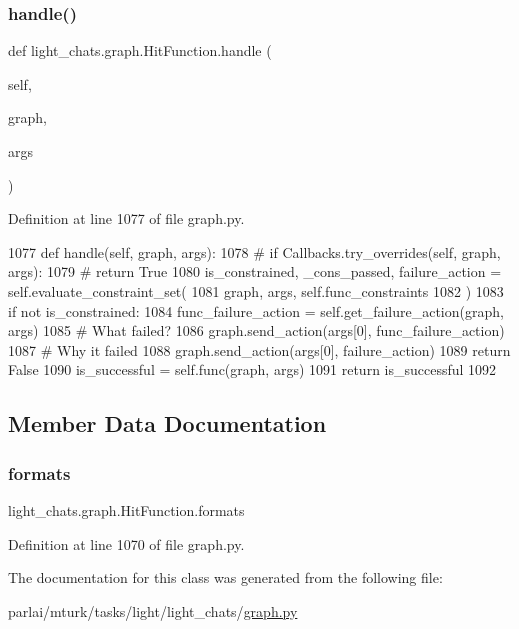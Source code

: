 \subsubsection{\texorpdfstring{handle()}{handle()}}
{\footnotesize\ttfamily def light\+\_\+chats.\+graph.\+Hit\+Function.\+handle (\begin{DoxyParamCaption}\item[{}]{self,  }\item[{}]{graph,  }\item[{}]{args }\end{DoxyParamCaption})}



Definition at line 1077 of file graph.\+py.


\begin{DoxyCode}
1077     \textcolor{keyword}{def }handle(self, graph, args):
1078         \textcolor{comment}{# if Callbacks.try\_overrides(self, graph, args):}
1079         \textcolor{comment}{#     return True}
1080         is\_constrained, \_cons\_passed, failure\_action = self.evaluate\_constraint\_set(
1081             graph, args, self.func\_constraints
1082         )
1083         \textcolor{keywordflow}{if} \textcolor{keywordflow}{not} is\_constrained:
1084             func\_failure\_action = self.get\_failure\_action(graph, args)
1085             \textcolor{comment}{# What failed?}
1086             graph.send\_action(args[0], func\_failure\_action)
1087             \textcolor{comment}{# Why it failed}
1088             graph.send\_action(args[0], failure\_action)
1089             \textcolor{keywordflow}{return} \textcolor{keyword}{False}
1090         is\_successful = self.func(graph, args)
1091         \textcolor{keywordflow}{return} is\_successful
1092 
\end{DoxyCode}


\subsection{Member Data Documentation}
\mbox{\label{classlight__chats_1_1graph_1_1HitFunction_a52f8cfade8a8bd90e48e125bc2232e44}} 
\subsubsection{\texorpdfstring{formats}{formats}}
{\footnotesize\ttfamily light\+\_\+chats.\+graph.\+Hit\+Function.\+formats}



Definition at line 1070 of file graph.\+py.



The documentation for this class was generated from the following file\+:\begin{DoxyCompactItemize}
\item 
parlai/mturk/tasks/light/light\+\_\+chats/\hyperlink{parlai_2mturk_2tasks_2light_2light__chats_2graph_8py}{graph.\+py}\end{DoxyCompactItemize}
